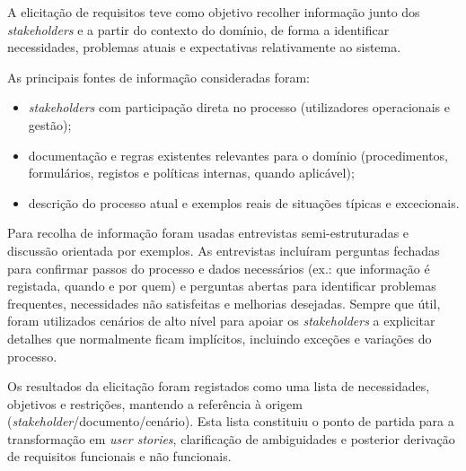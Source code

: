    A elicitação de requisitos teve como objetivo recolher informação junto dos \textit{stakeholders} e a partir do contexto do domínio, de forma a identificar necessidades, problemas atuais e expectativas relativamente ao sistema.

    As principais fontes de informação consideradas foram:
    \begin{itemize}
      \item \textit{stakeholders} com participação direta no processo (utilizadores operacionais e gestão);
      \item documentação e regras existentes relevantes para o domínio (procedimentos, formulários, registos e políticas internas, quando aplicável);
      \item descrição do processo atual e exemplos reais de situações típicas e excecionais.
    \end{itemize}

    Para recolha de informação foram usadas entrevistas semi-estruturadas e discussão orientada por exemplos. As entrevistas incluíram perguntas fechadas para confirmar passos do processo e dados necessários (ex.: que informação é registada, quando e por quem) e perguntas abertas para identificar problemas frequentes, necessidades não satisfeitas e melhorias desejadas. Sempre que útil, foram utilizados cenários de alto nível para apoiar os \textit{stakeholders} a explicitar detalhes que normalmente ficam implícitos, incluindo exceções e variações do processo.

    Os resultados da elicitação foram registados como uma lista de necessidades, objetivos e restrições, mantendo a referência à origem (\textit{stakeholder}/documento/cenário). Esta lista constituiu o ponto de partida para a transformação em \textit{user stories}, clarificação de ambiguidades e posterior derivação de requisitos funcionais e não funcionais.

